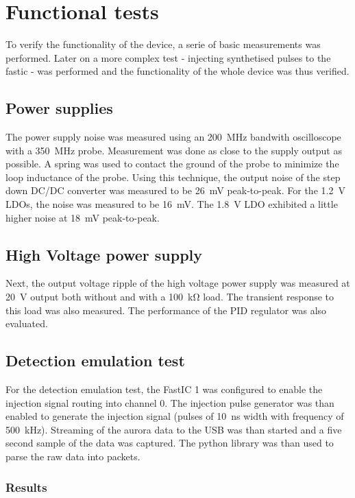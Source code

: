 \chapter{Functional tests}
To verify the functionality of the device, a serie of basic measurements was performed. Later on a more complex test - injecting synthetised pulses to the fastic - was performed and the functionality of the whole device was thus verified.
\section{Power supplies}
The power supply noise was measured using an \SI{200}{\mega\hertz} bandwith oscilloscope with a \SI{350}{\mega\hertz} probe. Measurement was done as close to the supply output as possible. A spring was used to contact the ground of the probe to minimize the loop inductance of the probe. Using this technique, the output noise of the step down DC/DC converter was measured to be \SI{26}{\milli\volt} peak-to-peak. For the \SI{1.2}{\volt} LDOs, the noise was measured to be \SI{16}{\milli\volt}. The \SI{1.8}{\volt} LDO exhibited a little higher noise at \SI{18}{\milli\volt} peak-to-peak.

\section{High Voltage power supply}
Next, the output voltage ripple of the high voltage power supply was measured at \SI{20}{\volt} output both without and with a \SI{100}{\kilo\ohm} load. The transient response to this load was also measured. The performance of the PID regulator was also evaluated.

\section{Detection emulation test}
For the detection emulation test, the FastIC 1 was configured to enable the injection signal routing into channel 0. The injection pulse generator was than enabled to generate the injection signal (pulses of \SI{10}{\nano\second} width with frequency of \SI{500}{\kilo\hertz}). Streaming of the aurora data to the USB was than started and a five second sample of the data was captured. The python library was than used to parse the raw data into packets.
\subsection{Results}